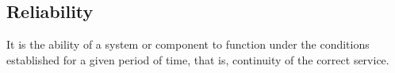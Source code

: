 \subsection{Reliability}

It is the ability of a system or component to function under the conditions established for a given period of time, that is, continuity of the correct service.